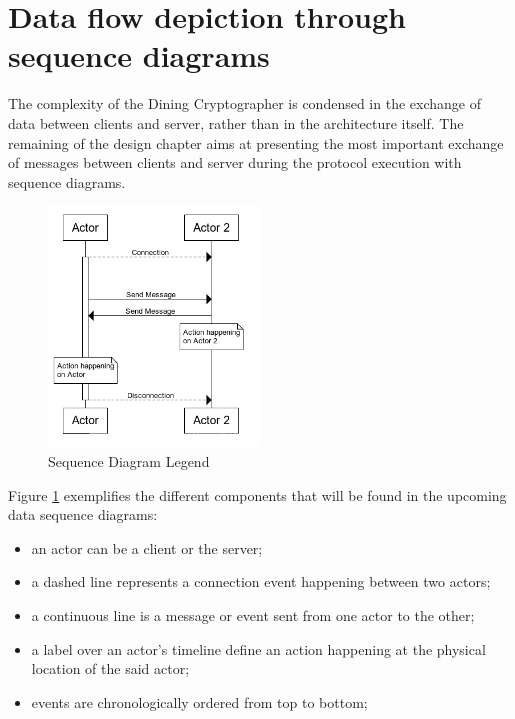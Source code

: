 \section{Data flow depiction through sequence diagrams}

The complexity of the Dining Cryptographer is condensed in the exchange of data between clients and server, rather than in the architecture itself. The remaining of the design chapter aims at presenting the most important exchange of messages between clients and server during the protocol execution with sequence diagrams. \newline


\begin{figure}[H]
    \centering
    \includegraphics[width=0.5\textwidth]{Images/Design/seqDiagramLegend.png}
    \caption{Sequence Diagram Legend}
    \label{fig:sequenceDiagramLegend}
\end{figure}

Figure \ref{fig:sequenceDiagramLegend} exemplifies the different components that will be found in the upcoming data sequence diagrams: 
\begin{itemize}
    \item an actor can be a client or the server;
    \item a dashed line represents a connection event happening between two actors;
    \item a continuous line is a message or event sent from one actor to the other;
    \item a label over an actor's timeline define an action happening at the physical location of the said actor;
    \item events are chronologically ordered from top to bottom;
\end{itemize}

